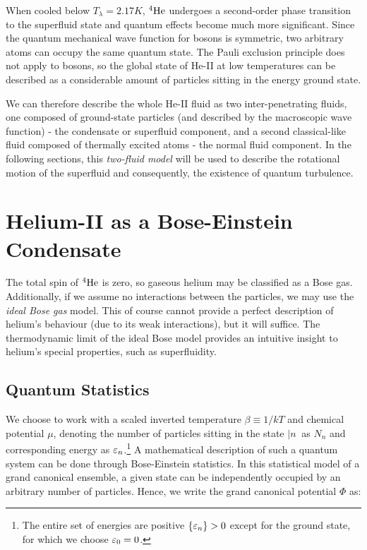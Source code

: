 When cooled below $ T_{\lambda}=2.17\unit{K} $, ${}^4\mathrm{He}$ undergoes a second-order phase transition to the superfluid state and quantum effects become much more significant. Since the quantum mechanical wave function for bosons is symmetric, two arbitrary atoms can occupy the same quantum state. The Pauli exclusion principle does not apply to bosons, so the global state of He-II at low temperatures can be described as a considerable amount of particles sitting in the energy ground state.

We can therefore describe the whole He-II fluid as two inter-penetrating fluids, one composed of ground-state particles (and described by the macroscopic wave function) - the condensate or superfluid component, and a second classical-like fluid composed of thermally excited atoms - the normal fluid component. In the following sections, this \emph{two-fluid model} will be used to describe the rotational motion of the superfluid and consequently, the existence of quantum turbulence.

\newpage

\section{Helium-II as a Bose-Einstein Condensate}
The total spin of ${}^4\mathrm{He}$ is zero, so gaseous helium may be classified as a Bose gas. Additionally, if we assume no interactions between the particles, we may use the \textit{ideal Bose gas} model. This of course cannot provide a perfect description of helium's behaviour (due to its weak interactions), but it will suffice. The thermodynamic limit of the ideal Bose model provides an intuitive insight to helium's special properties, such as superfluidity.

\subsection*{Quantum Statistics}

We choose to work with a scaled inverted temperature $\beta\equiv 1/kT $ and chemical potential $\mu$, denoting the number of particles sitting in the state $\vert n\>$ as $N_n$ and corresponding energy as $\varepsilon_n$.\footnote{The entire set of energies are positive $\{\varepsilon_n\} > 0$ except for the ground state, for which we choose $\varepsilon_0 = 0$.}
A mathematical description of such a quantum system can be done through Bose-Einstein statistics. In this statistical model of a grand canonical ensemble, a given state can be independently occupied by an arbitrary number of particles. Hence, we write the grand canonical potential $ \Phi $ as:


